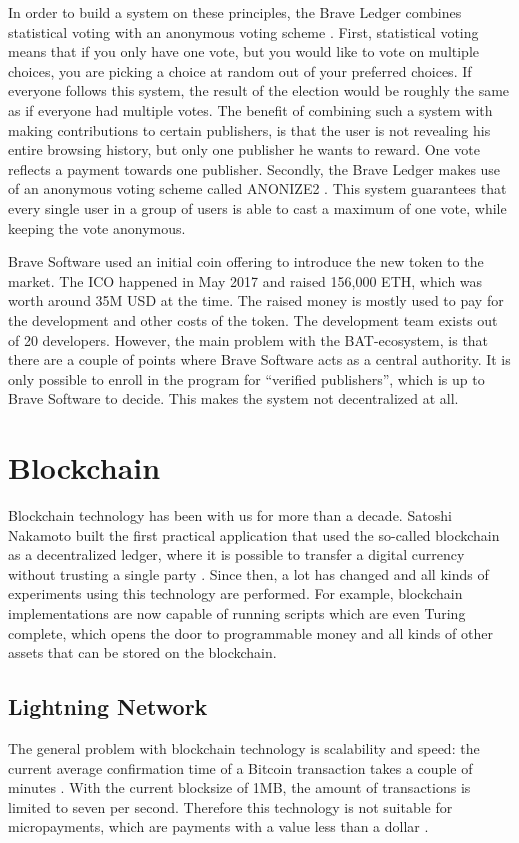 In order to build a system on these principles, the Brave Ledger combines statistical voting with an anonymous voting scheme \cite{bat-ledger}. First, statistical voting means that if you only have one vote, but you would like to vote on multiple choices, you are picking a choice at random out of your preferred choices. If everyone follows this system, the result of the election would be roughly the same as if everyone had multiple votes. The benefit of combining such a system with making contributions to certain publishers, is that the user is not revealing his entire browsing history, but only one publisher he wants to reward. One vote reflects a payment towards one publisher. Secondly, the Brave Ledger makes use of an anonymous voting scheme called ANONIZE2 \cite{hohenberger2014anonize, hohenberger2015overview}. This system guarantees that every single user in a group of users is able to cast a maximum of one vote, while keeping the vote anonymous.

Brave Software used an initial coin offering to introduce the new token to the market. The ICO happened in May 2017 and raised 156,000 ETH, which was worth around 35M USD at the time. The raised money is mostly used to pay for the development and other costs of the token. The development team exists out of 20 developers. However, the main problem with the BAT-ecosystem, is that there are a couple of points where Brave Software acts as a central authority. It is only possible to enroll in the program for ``verified publishers'', which is up to Brave Software to decide. This makes the system not decentralized at all.

\section{Blockchain}

Blockchain technology has been with us for more than a decade. Satoshi Nakamoto built the first practical application that used the so-called blockchain as a decentralized ledger, where it is possible to transfer a digital currency without trusting a single party \cite{nakamoto2019bitcoin}. Since then, a lot has changed and all kinds of experiments using this technology are performed. For example, blockchain implementations are now capable of running scripts which are even Turing complete, which opens the door to programmable money \cite{wood2014ethereum} and all kinds of other assets that can be stored on the blockchain.

\subsection{Lightning Network}
\label{sec:lightning}
The general problem with blockchain technology is scalability and speed: the current average confirmation time of a Bitcoin transaction takes a couple of minutes \cite{bamert2013have}. With the current blocksize of 1MB, the amount of transactions is limited to seven per second. Therefore this technology is not suitable for micropayments, which are payments with a value less than a dollar \cite{definitionmicropayment}.

